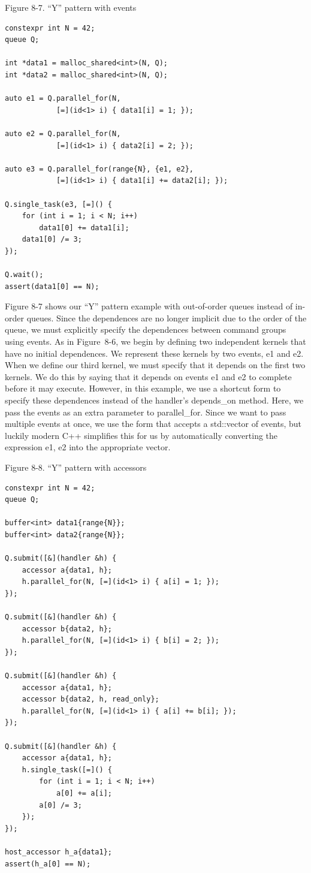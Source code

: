 \hspace*{\fill} \par %
Figure 8-7. “Y” pattern with events
\begin{lstlisting}[caption={}]
constexpr int N = 42;
queue Q;

int *data1 = malloc_shared<int>(N, Q);
int *data2 = malloc_shared<int>(N, Q);

auto e1 = Q.parallel_for(N, 
			[=](id<1> i) { data1[i] = 1; });

auto e2 = Q.parallel_for(N, 
			[=](id<1> i) { data2[i] = 2; });

auto e3 = Q.parallel_for(range{N}, {e1, e2},
			[=](id<1> i) { data1[i] += data2[i]; });
	
Q.single_task(e3, [=]() {
	for (int i = 1; i < N; i++)
		data1[0] += data1[i];
	data1[0] /= 3;
});

Q.wait();
assert(data1[0] == N);
\end{lstlisting}

Figure 8-7 shows our “Y” pattern example with out-of-order queues instead of in-order queues. Since the dependences are no longer implicit due to the order of the queue, we must explicitly specify the dependences between command groups using events. As in Figure 8-6, we begin by defining two independent kernels that have no initial dependences. We represent these kernels by two events, e1 and e2. When we define our third kernel, we must specify that it depends on the first two kernels. We do this by saying that it depends on events e1 and e2 to complete before it may execute. However, in this example, we use a shortcut form to specify these dependences instead of the handler’s depends\_on method. Here, we pass the events as an extra parameter to parallel\_for. Since we want to pass multiple events at once, we use the form that accepts a std::vector of events, but luckily modern C++ simplifies this for us by automatically converting the expression {e1, e2} into the appropriate vector.\par

\hspace*{\fill} \par %
Figure 8-8. “Y” pattern with accessors
\begin{lstlisting}[caption={}]
constexpr int N = 42;
queue Q;

buffer<int> data1{range{N}};
buffer<int> data2{range{N}};

Q.submit([&](handler &h) {
	accessor a{data1, h};
	h.parallel_for(N, [=](id<1> i) { a[i] = 1; });
});

Q.submit([&](handler &h) {
	accessor b{data2, h};
	h.parallel_for(N, [=](id<1> i) { b[i] = 2; });
});

Q.submit([&](handler &h) {
	accessor a{data1, h};
	accessor b{data2, h, read_only};
	h.parallel_for(N, [=](id<1> i) { a[i] += b[i]; });
});

Q.submit([&](handler &h) {
	accessor a{data1, h};
	h.single_task([=]() {
		for (int i = 1; i < N; i++)
			a[0] += a[i];
		a[0] /= 3;
	});
});

host_accessor h_a{data1};
assert(h_a[0] == N);
\end{lstlisting}

